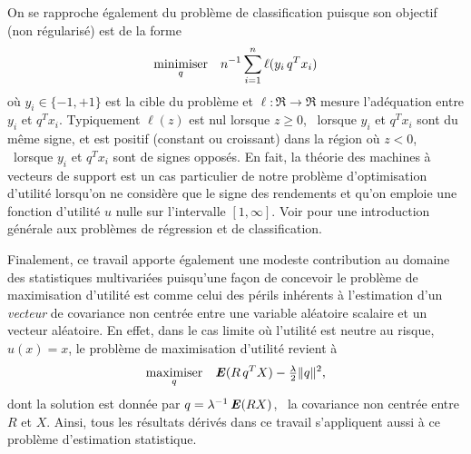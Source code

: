 On se rapproche également du problème de classification puisque son objectif (non
régularisé) est de la forme
\begin{equation}
  \minimizeEquation[q]{n^{-1}\sumi\ell(y_i\,q^Tx_i)}
\end{equation}
où $y_i\in\{-1,+1\}$ est la cible du problème et $\ell:\Re\to\Re$ mesure l'adéquation entre
$y_i$ et $q^Tx_i$. Typiquement $\ell(z)$ est nul lorsque $z\ge0$, \ie\ lorsque $y_i$ et
$q^Tx_i$ sont du même signe, et est positif (constant ou croissant) dans la région où
$z<0$, \ie\ lorsque $y_i$ et $q^Tx_i$ sont de signes opposés. En fait, la théorie des
machines à vecteurs de support est un cas particulier de notre problème d'optimisation
d'utilité lorsqu'on ne considère que le signe des rendements et qu'on emploie une fonction
d'utilité $u$ nulle sur l'intervalle $[1,\infty]$. Voir \cite{mohri2012foundations} pour une
introduction générale aux problèmes de régression et de classification.

Finalement, ce travail apporte également une modeste contribution au domaine des
statistiques multivariées puisqu'une façon de concevoir le problème de maximisation
d'utilité est comme celui des périls inhérents à l'estimation d'un \textit{vecteur} de
covariance non centrée entre une variable aléatoire scalaire et un vecteur aléatoire. En
effet, dans le cas limite où l'utilité est neutre au risque, \ie\ $u(x) = x$, le problème
de maximisation d'utilité revient à
\begin{equation}
  \maximizeEquation[q]{\E(R\,q^TX) - \tfrac{\lambda}{2}\|q\|^2,}
\end{equation}
dont la solution est donnée par $q =  \lambda^{-1}\E(RX)$, \ie\ la covariance non centrée
entre $R$ et $X$. Ainsi, tous les résultats dérivés dans ce travail s'appliquent aussi à
ce problème d'estimation statistique.



